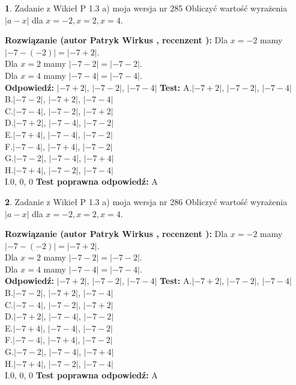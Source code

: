 \documentclass[12pt, a4paper]{article}
\theoremstyle{definition} %
\newtheorem{zad}{}
\newcommand{\zadStart}[1]{\begin{zad}#1\newline}
\newcommand{\zadStop}{\end{zad}}
\newcommand{\rozwStart}[2]{\noindent \textbf{Rozwiązanie (autor #1 , recenzent #2): }\newline}
\newcommand{\rozwStop}{\newline}
\newcommand{\odpStart}{\noindent \textbf{Odpowiedź:}\newline}
\newcommand{\odpStop}{\newline}
\newcommand{\testStart}{\noindent \textbf{Test:}\newline}
\newcommand{\testStop}{\newline}
\newcommand{\kluczStart}{\noindent \textbf{Test poprawna odpowiedź:}\newline}
\newcommand{\kluczStop}{\newline}
\begin{document}
\zadStart{Zadanie z Wikieł P 1.3 a) moja wersja nr 285}
Obliczyć wartość wyrażenia $|a - x|$ dla $x=-2,x=2,x=4$.
\zadStop
\rozwStart{Patryk Wirkus}{}
Dla $x = -2$ mamy $|-7 - (-2)| = |-7 + 2|$.\\
Dla $x = 2$ mamy $|-7 - 2| = |-7 - 2|$.\\
Dla $x = 4$ mamy $|-7 - 4| = |-7 - 4|$.\\
\rozwStop
\odpStart
$|-7 + 2|$, $|-7 - 2|$, $|-7 - 4|$
\odpStop
\testStart
A.$|-7 + 2|$, $|-7 - 2|$, $|-7 - 4|$\\
B.$|-7 - 2|$, $|-7 + 2|$, $|-7 - 4|$\\
C.$|-7 - 4|$, $|-7 - 2|$, $|-7 + 2|$\\
D.$|-7 + 2|$, $|-7 - 4|$, $|-7 - 2|$\\
E.$|-7 + 4|$, $|-7 - 4|$, $|-7 - 2|$\\
F.$|-7 - 4|$, $|-7 + 4|$, $|-7 - 2|$\\
G.$|-7 - 2|$, $|-7 - 4|$, $|-7 + 4|$\\
H.$|-7 + 4|$, $|-7 - 2|$, $|-7 - 4|$\\
I.$0$, $0$, $0$
\testStop
\kluczStart
A
\kluczStop



\zadStart{Zadanie z Wikieł P 1.3 a) moja wersja nr 286}
Obliczyć wartość wyrażenia $|a - x|$ dla $x=-2,x=2,x=4$.
\zadStop
\rozwStart{Patryk Wirkus}{}
Dla $x = -2$ mamy $|-7 - (-2)| = |-7 + 2|$.\\
Dla $x = 2$ mamy $|-7 - 2| = |-7 - 2|$.\\
Dla $x = 4$ mamy $|-7 - 4| = |-7 - 4|$.\\
\rozwStop
\odpStart
$|-7 + 2|$, $|-7 - 2|$, $|-7 - 4|$
\odpStop
\testStart
A.$|-7 + 2|$, $|-7 - 2|$, $|-7 - 4|$\\
B.$|-7 - 2|$, $|-7 + 2|$, $|-7 - 4|$\\
C.$|-7 - 4|$, $|-7 - 2|$, $|-7 + 2|$\\
D.$|-7 + 2|$, $|-7 - 4|$, $|-7 - 2|$\\
E.$|-7 + 4|$, $|-7 - 4|$, $|-7 - 2|$\\
F.$|-7 - 4|$, $|-7 + 4|$, $|-7 - 2|$\\
G.$|-7 - 2|$, $|-7 - 4|$, $|-7 + 4|$\\
H.$|-7 + 4|$, $|-7 - 2|$, $|-7 - 4|$\\
I.$0$, $0$, $0$
\testStop
\kluczStart
A
\kluczStop
\end{document}
